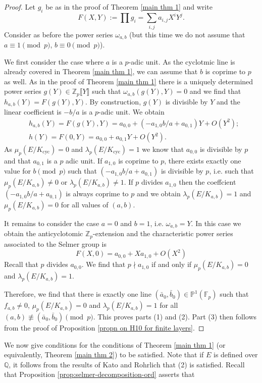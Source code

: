 \documentclass[12pt]{amsart}
\newcommand{\Z}{\mathbb{Z}}
\newcommand{\Q}{\mathbb{Q}}
\newcommand{\F}{\mathbb{F}}
\newcommand{\op}[1]{\operatorname{#1}}
\numberwithin{equation}{section}
\begin{document}
\begin{proof}
    Let $g_i$ be as in the proof of Theorem \ref{main thm 1} and write \[F(X,Y):=\prod g_i=\sum_{i,j}a_{i,j}X^iY^j.\] Consider as before the power series $\omega_{a,b}$ (but this time we do not assume that $a\equiv 1\pmod{p}$, $b\equiv 0\pmod{p}$). 

    We first consider the case where $a$ is a $p$-adic unit. As the cyclotmic line is already covered in Theorem \ref{main thm 1}, we can assume that $b$ is coprime to $p$ as well. As in the proof of Theorem \ref{main thm 1} there is a uniquely determined power series $g(Y)\in \Z_p\llbracket Y\rrbracket$ such that $\omega_{a,b}(g(Y), Y)=0$ and we find that $h_{a,b}(Y)=F(g(Y),Y)$. By construction, $g(Y)$ is divisible by $Y$ and the linear coefficient is $-b/a$ is a $p$-adic unit. We obtain
    \[\begin{split}& h_{a,b}(Y)=F(g(Y),Y)=a_{0,0}+(-a_{1,0}b/a+a_{0,1})Y+O(Y^2);\\
    &h(Y)=F(0,Y)=a_{0,0}+a_{0,1}Y+O(Y^2).\end{split}\]
    As $\mu_p(E/K_{\op{cyc}})=0$ and $\lambda_p(E/K_{\op{cyc}})=1$ we know that $a_{0,0}$ is divisible by $p$ and that $a_{0,1}$ is a $p$ adic unit. If $a_{1,0}$ is coprime to $p$, there exists exactly one value for $b\pmod p$ such that $(-a_{1,0}b/a+a_{0,1})$ is divisible by $p$, i.e. such that $\mu_p(E/K_{a,b})\neq 0$ or $\lambda_p(E/K_{a,b})\neq 1$. If $p$ divides $a_{1,0}$ then the coeffcient $(-a_{1,0}b/a+a_{0,1})$ is always coprime to $p$ and we obtain $\lambda_p(E/K_{a,b})=1$ and $\mu_p(E/K_{a,b})=0$ for all values of $(a,b)$. 

    It remains to consider the case $a=0$ and $b=1$, i.e. $\omega_{a,b}=Y$. In this case we obtain the anticyclotomic $\Z_p$-extension and the characteristic power series associated to the Selmer group is 
    \[F(X, 0)=a_{0,0}+Xa_{1,0}+O(X^2)\]
    Recall that $p$ divides $a_{0,0}$. We find that $p\nmid  a_{1,0}$ if and only if $\mu_p(E/K_{a,b})=0$ and $\lambda_p(E/K_{a,b})=1$.

    Therefore, we find that there is exactly one line $(\bar{a}_0, \bar{b}_0)\in \mathbb{P}^1(\F_p)$ such that $f_{a,b}\neq 0$, $\mu_p(E/K_{a,b})=0$ and $\lambda_p(E/K_{a,b})=1$ for all $(a,b)\not\equiv (\bar{a}_0, \bar{b}_0)\pmod{p}$. This proves parts (1) and (2). Part (3) then follows from the proof of Proposition \ref{propn on H10 for finite layers}.
\end{proof}
We now give conditions for the conditions of Theorem \ref{main thm 1} (or equivalently, Theorem \ref{main thm 2}) to be satisfied. Note that if $E$ is defined over $\Q$, it follows from the results of Kato and Rohrlich that (2) is satisfied. Recall that Proposition \ref{prop:selmer-decomposition-ord} asserts that 
\end{document}
